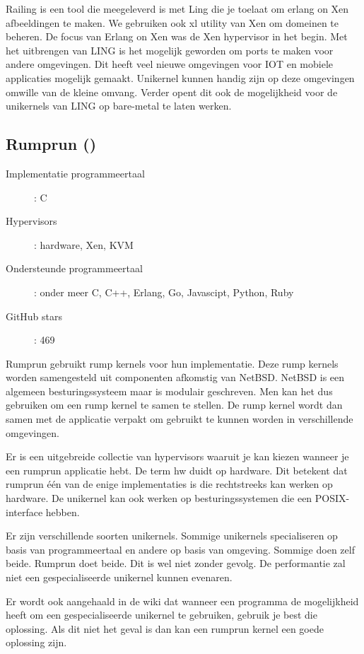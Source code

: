 \documentclass[pdftex,a4paper,12pt,twoside]{report}
\begin{document}
Railing is een tool die meegeleverd is met Ling die je toelaat om erlang on Xen afbeeldingen te maken. We gebruiken ook xl utility van Xen om domeinen te beheren.
De focus van Erlang on Xen was de Xen hypervisor in het begin. Met het uitbrengen van LING is het mogelijk geworden om ports te maken voor andere omgevingen. Dit heeft veel nieuwe omgevingen voor IOT en mobiele applicaties mogelijk gemaakt.
Unikernel kunnen handig zijn op deze omgevingen omwille van de kleine omvang. Verder opent dit ook de mogelijkheid voor de unikernels van LING op bare-metal te laten werken.

\subsection{Rumprun (\cite{rumpkernel/rumprun_0000})}

\begin{description}
  \item [Implementatie programmeertaal]: C
  \item [Hypervisors]: hardware, Xen, KVM
  \item [Ondersteunde programmeertaal]: onder meer C, C++, Erlang, Go, Javascipt, Python, Ruby
  \item [GitHub stars]: 469
\end{description}

Rumprun gebruikt rump kernels voor hun implementatie. Deze rump kernels worden samengesteld uit componenten afkomstig van NetBSD. NetBSD is een algemeen besturingssysteem maar is modulair geschreven.
Men kan het dus gebruiken om een rump kernel te samen te stellen. De rump kernel wordt dan samen met de applicatie verpakt om gebruikt te kunnen worden in verschillende omgevingen.

Er is een uitgebreide collectie van hypervisors waaruit je kan kiezen wanneer je een rumprun applicatie hebt. De term hw duidt op hardware. Dit betekent dat rumprun één van de enige implementaties is die rechtstreeks kan werken op hardware. De unikernel kan ook werken op besturingssystemen die een POSIX-interface hebben.

Er zijn verschillende soorten unikernels. Sommige unikernels specialiseren op basis van programmeertaal en andere op basis van omgeving. Sommige doen zelf beide. Rumprun doet beide. Dit is wel niet zonder gevolg. De performantie zal niet een gespecialiseerde unikernel kunnen evenaren.

Er wordt ook aangehaald in de wiki dat wanneer een programma de mogelijkheid heeft om een gespecialiseerde unikernel te gebruiken, gebruik je best die oplossing. Als dit niet het geval is dan kan een rumprun kernel een goede oplossing zijn.
\end{document}
